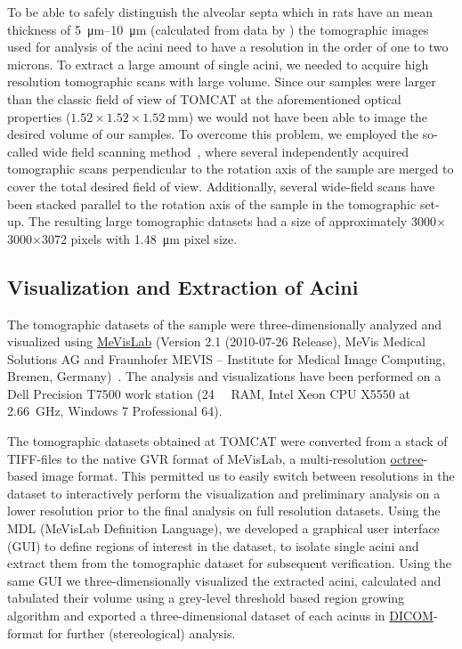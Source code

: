 \documentclass[a4paper,DIVcalc,abstract,english]{scrartcl}
\begin{document}
To be able to safely distinguish the alveolar septa which in rats have an mean thickness of \SIrange{5}{10}{\micro\meter} (calculated from data by \citet{Burri1974}) the tomographic images used for analysis of the acini need to have a resolution in the order of one to two microns.
To extract a large amount of single acini, we needed to acquire high resolution tomographic scans with large volume.
Since our samples were larger than the classic field of view of TOMCAT at the aforementioned optical properties (\(1.52\times1.52\times\SI{1.52}{\milli\meter}\)) we would not have been able to image the desired volume of our samples.
To overcome this problem, we employed the so-called wide field scanning method~\cite{Haberthuer2010a}, where several independently acquired tomographic scans perpendicular to the rotation axis of the sample are merged to cover the total desired field of view.
Additionally, several wide-field scans have been stacked parallel to the rotation axis of the sample in the tomographic set-up.
The resulting large tomographic datasets had a size of approximately 3000\(\times\)3000\(\times\)3072 pixels with \SI{1.48}{\micro\meter} pixel size.

\subsection{Visualization and Extraction of Acini}
The tomographic datasets of the sample were three-dimensionally analyzed and visualized using \href{http://mevislab.de}{MeVisLab} (Version 2.1 (2010-07-26 Release), MeVis Medical Solutions AG and Fraunhofer MEVIS -- Institute for Medical Image Computing, Bremen, Germany)~\cite{Bitter2007}.
The analysis and visualizations have been performed on a Dell Precision T7500 work station (\SI{24}{\giga\byte} RAM, Intel Xeon CPU X5550 at \SI{2.66}{\giga\hertz}, Windows 7 Professional \SI{64}{\bit}).

The tomographic datasets obtained at TOMCAT were converted from a stack of TIFF-files to the native GVR format of MeVisLab, a multi-resolution \href{https://secure.wikimedia.org/wikipedia/en/w/index.php?title=Octree&oldid=409131920}{octree}-based image format.
This permitted us to easily switch between resolutions in the dataset to interactively perform the visualization and preliminary analysis on a lower resolution prior to the final analysis on full resolution datasets.
Using the MDL (MeVisLab Definition Language), we developed a graphical user interface (GUI) to define regions of interest in the dataset, to isolate single acini and extract them from the tomographic dataset for subsequent verification.
Using the same GUI we three-dimensionally visualized the extracted acini, calculated and tabulated their volume using a grey-level threshold based region growing algorithm and exported a three-dimensional dataset of each acinus in \href{http://en.wikipedia.org/w/index.php?title=DICOM&oldid=511155074}{DICOM}-format for further (stereological) analysis.
\end{document}
